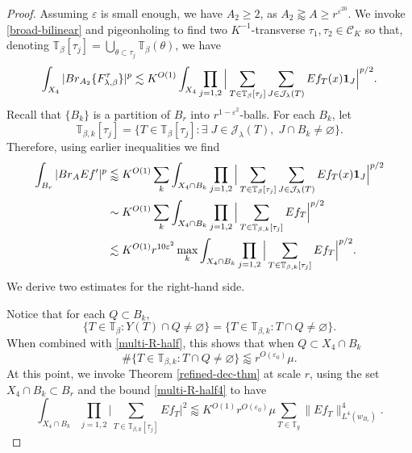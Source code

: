 \documentclass[10pt,a4paper]{amsart}
\newcommand{\Br}{{\rm{Br}}}
\newcommand{\Id}{{\bf{1}}}
\newcommand{\ZT}{\mathbb{T}}
\newcommand{\be}{\beta}
\newcommand{\cC}{{\mathcal C}}
\newcommand{\cj}{\mathcal J}
\newcommand{\e}{\varepsilon}
\newcommand{\la}{\lambda}
\begin{document}
\begin{proof}
	Assuming $\e$ is small enough, we have $A_2\ge 2$, as $A_2\gtrapprox A\ge r^{\e^{20}}$.
	We invoke \eqref{broad-bilinear} and pigeonholing to find two $K^{-1}$-transverse $\tau_1,\tau_2\in\cC_K$ so that, denoting $\ZT_{\be}[\tau_j]=\bigcup_{\theta\subset\tau_j}\ZT_{\be}(\theta)$, we have
	\begin{align}
		\nonumber
        \int_{X_4}|\Br_{A_2} \{F_{\lambda,\beta}^{\tau}\}|^p
		\lesssim K^{O(1)}\int_{ X_4}\prod_{j=1,2}\Big|\sum_{T\in\ZT_{\be}[\tau_j]}\sum_{J\in\cj_{\la}(T)}Ef_{T}(x)\Id_J\Big|^{p/2}.
	\end{align}
	Recall that $\{B_k\}$ is a partition of $B_r$ into $r^{1-\e^2}$-balls. 
	For each $B_k$, let $$\ZT_{\be, k}[\tau_j]=\{T\in\ZT_{\be}[\tau_j]: \exists \;J\in\cj_{\la}(T),\; J\cap B_k\not=\varnothing\}.$$
	Therefore, using earlier inequalities we find
	\begin{align}
		\label{X-4}
		\int_{B_r}|\Br_{A} Ef'|^p&\lessapprox K^{O(1)} \sum_k\int_{X_4\cap B_k}\prod_{j=1,2}\Big|\sum_{T\in\ZT_{\be}[\tau_j]}\sum_{J\in\cj_{\la}(T)}Ef_{T}(x)\Id_J\Big|^{p/2}\\ \nonumber
		&\sim K^{O(1)}\sum_k\int_{X_4\cap B_k}\prod_{j=1,2}\Big|\sum_{T\in\ZT_{\be, k}[\tau_j]}Ef_{T}\Big|^{p/2}\\ 
        \nonumber
		&\lesssim  K^{O(1)} r^{10\e^2}\max_k\int_{X_4\cap B_k}\prod_{j=1,2}\Big|\sum_{T\in\ZT_{\be, k}[\tau_j]}Ef_{T}\Big|^{p/2}.
	\end{align}
    We derive two estimates for the right-hand side. 
    
	Notice that for each $Q\subset B_k$,
	\begin{equation}
		\nonumber
		\{T\in\ZT_{\be}:Y(T)\cap Q\not=\varnothing\}=\{T\in\ZT_{\be,k}:T\cap Q\not=\varnothing\}.
	\end{equation}
    When combined with \eqref{multi-R-half}, this shows that when $Q\subset X_4\cap B_k$
    \begin{equation}
    \label{multi-R-half4}
    \#\{T\in\ZT_{\be, k}:T\cap Q\not=\varnothing\}\lessapprox r^{O(\e_0)}\mu.
    \end{equation}
	At this point, we invoke Theorem \ref{refined-dec-thm} at scale $r$, using the set $X_4\cap B_k\subset B_r$ and  the bound \eqref{multi-R-half4}  to have
	\begin{equation}
		\label{jkijurgu98tug8tug89t}
		\int_{X_4\cap B_k}\prod_{j=1,2}\Big|\sum_{T\in\ZT_{\be, k}[\tau_j]}Ef_{T}\Big|^2\lessapprox K^{O(1)} r^{O(\e_0)} \mu\sum_{T\in\ZT_g}\big\|Ef_T\big\|_{L^4(w_{B_r})}^4.
	\end{equation}
	

\end{proof}
\end{document}
